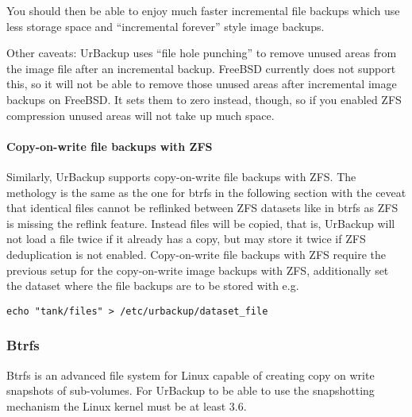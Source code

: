 \documentclass[a4paper,10pt]{article}
\begin{document}
\noindent You should then be able to enjoy much faster incremental file backups which use less storage space
and ``incremental forever'' style image backups.

Other caveats: UrBackup uses ``file hole punching'' to remove unused areas from the image file
after an incremental backup. FreeBSD currently does not support this, so it will not be able
to remove those unused areas after incremental image backups on FreeBSD. It sets them to zero instead, though, so if you enabled ZFS compression unused areas will not take up much space.

\paragraph{Copy-on-write file backups with ZFS}
Similarly, UrBackup supports copy-on-write file backups with ZFS. The methology is the same as 
the one for btrfs in the following section with the ceveat that identical files cannot be reflinked
between ZFS datasets like in btrfs as ZFS is missing the reflink feature. Instead files will be copied, that is, UrBackup
will not load a file twice if it already has a copy, but may store it twice if ZFS deduplication is not enabled.
Copy-on-write file backups with ZFS require the previous setup for the copy-on-write image backups with ZFS, additionally
set the dataset where the file backups are to be stored with e.g.
\begin{verbatim}
echo "tank/files" > /etc/urbackup/dataset_file
\end{verbatim}

\subsubsection{Btrfs}
\label{subsec_btrfs_setup}

Btrfs is an advanced file system for Linux capable of creating copy on write
snapshots of sub-volumes. For UrBackup to be
able to use the snapshotting mechanism the Linux kernel must be at least 3.6.
\end{document}
